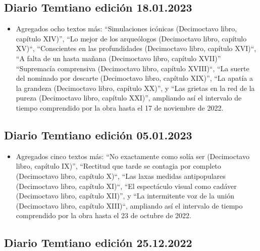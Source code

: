 \documentclass[
]{book}
\providecommand{\tightlist}{%
  \setlength{\itemsep}{0pt}\setlength{\parskip}{0pt}}
\begin{document}
\hypertarget{diario-temtiano-ediciuxf3n-18.01.2023}{%
\subsection*{Diario Temtiano edición 18.01.2023}\label{diario-temtiano-ediciuxf3n-18.01.2023}}

\begin{itemize}
\tightlist
\item
  Agregados ocho textos más: ``Simulaciones icónicas (Decimoctavo libro, capítulo XIV)'', ``Lo mejor de los arqueólogos (Decimoctavo libro, capítulo XV)``, ``Conscientes en las profundidades (Decimoctavo libro, capítulo XVI)``, ``A falta de un hasta mañana (Decimoctavo libro, capítulo XVII)'' ``Supremacía comprensiva (Decimoctavo libro, capítulo XVIII)``, ``La suerte del nominado por descarte (Decimoctavo libro, capítulo XIX)'', ``La apatía a la grandeza (Decimoctavo libro, capítulo XX)'', y ``Las grietas en la red de la pureza (Decimoctavo libro, capítulo XXI)'', ampliando así el intervalo de tiempo comprendido por la obra hasta el 17 de noviembre de 2022.
\end{itemize}

\hypertarget{diario-temtiano-ediciuxf3n-05.01.2023}{%
\subsection*{Diario Temtiano edición 05.01.2023}\label{diario-temtiano-ediciuxf3n-05.01.2023}}

\begin{itemize}
\tightlist
\item
  Agregados cinco textos más: ``No exactamente como solía ser (Decimoctavo libro, capítulo IX)'', ``Rectitud que tarde se contagia por completo (Decimoctavo libro, capítulo X)``, ``Las laxas medidas antipopulares (Decimoctavo libro, capítulo XI)``, ``El espectáculo visual como cadáver (Decimoctavo libro, capítulo XII)'', y ``La intermitente voz de la unión (Decimoctavo libro, capítulo XIII)``, ampliando así el intervalo de tiempo comprendido por la obra hasta el 23 de octubre de 2022.
\end{itemize}

\hypertarget{diario-temtiano-ediciuxf3n-25.12.2022}{%
\subsection*{Diario Temtiano edición 25.12.2022}\label{diario-temtiano-ediciuxf3n-25.12.2022}}
\end{document}
